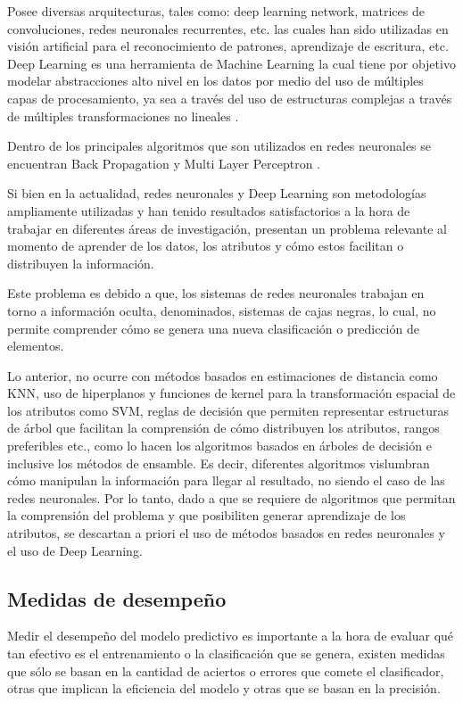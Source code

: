 Posee diversas arquitecturas, tales como: deep learning network, matrices de convoluciones, redes neuronales recurrentes, etc. las cuales han sido utilizadas en visión artificial para el reconocimiento de patrones, aprendizaje de escritura, etc. Deep Learning es una herramienta de Machine Learning la cual tiene por objetivo modelar abstracciones alto nivel en los datos por medio del uso de múltiples capas de procesamiento, ya sea a través del uso de estructuras complejas a través de múltiples transformaciones no lineales \cite{arel2010deep}.

Dentro de los principales algoritmos que son utilizados en redes neuronales se encuentran Back Propagation \cite{HECHTNIELSEN199265} y Multi Layer Perceptron \cite{80266}.

Si bien en la actualidad, redes neuronales y Deep Learning son metodologías ampliamente utilizadas y han tenido resultados satisfactorios a la hora de trabajar en diferentes áreas de investigación, presentan un problema relevante al momento de aprender de los datos, los atributos y cómo estos facilitan o distribuyen la información.

Este problema es debido a que, los sistemas de redes neuronales trabajan en torno a información oculta, denominados, sistemas de cajas negras, lo cual, no permite comprender cómo se genera una nueva clasificación o predicción de elementos. 

Lo anterior, no ocurre con métodos basados en estimaciones de distancia como KNN, uso de hiperplanos y funciones de kernel para la transformación espacial de los atributos como SVM, reglas de decisión que permiten representar estructuras de árbol que facilitan la comprensión de cómo distribuyen los atributos, rangos preferibles etc., como lo hacen los algoritmos basados en árboles de decisión e inclusive los métodos de ensamble. Es decir, diferentes algoritmos vislumbran cómo manipulan la información para llegar al resultado, no siendo el caso de las redes neuronales. Por lo tanto, dado a que se requiere de algoritmos que permitan la comprensión del problema y que posibiliten generar aprendizaje de los atributos, se descartan a priori el uso de métodos basados en redes neuronales y el uso de Deep Learning.


\subsection{Medidas de desempeño}

Medir el desempeño del modelo predictivo es importante a la hora de evaluar qué tan efectivo es el entrenamiento o la clasificación que se genera, existen medidas que sólo se basan en la cantidad de aciertos o errores que comete el clasificador, otras que implican la eficiencia del modelo y otras que se basan en la precisión.

